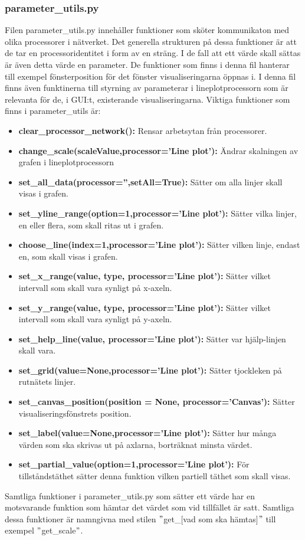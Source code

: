 \subsubsection{parameter\_utils.py}\label{sssec:paramUtils}
Filen parameter\_utils.py innehåller funktioner som sköter kommunikaton med olika processorer i nätverket. Det generella strukturen på dessa funktioner är att de tar en processoridentitet i form av en sträng. I de fall att ett värde skall sättas är även detta värde en parameter. De funktioner som finns i denna fil hanterar till exempel fönsterposition för det fönster visualiseringarna öppnas i. I denna fil finns även funktinerna till styrning av parameterar i lineplotprocessorn som är relevanta för de, i GUI:t, existerande visualiseringarna. 
Viktiga funktioner som finns i parameter\_utils är:
\begin{itemize}
    \setlength\itemsep{0em}
    \item \textbf{clear\_processor\_network(): }Rensar arbetsytan från processorer.
    \item \textbf{change\_scale(scaleValue,processor='Line plot'): }Ändrar skalningen av grafen i lineplotprocessorn
    \item \textbf{set\_all\_data(processor='',setAll=True): }Sätter om alla linjer skall visas i grafen.
    \item \textbf{set\_yline\_range(option=1,processor='Line plot'): }Sätter vilka linjer, en eller flera, som skall ritas ut i grafen.
    \item \textbf{choose\_line(index=1,processor='Line plot'): }Sätter vilken linje, endast en, som skall visas i grafen.
    \item \textbf{set\_x\_range(value, type, processor='Line plot'): }Sätter vilket intervall som skall vara synligt på x-axeln.
    \item \textbf{set\_y\_range(value, type, processor='Line plot'): }Sätter vilket intervall som skall vara synligt på y-axeln.
    \item \textbf{set\_help\_line(value, processor='Line plot'): }Sätter var hjälp-linjen skall vara.
    \item \textbf{set\_grid(value=None,processor='Line plot'): }Sätter tjockleken på rutnätets linjer.
    \item \textbf{set\_canvas\_position(position = None, processor='Canvas'): }Sätter visualiseringsfönstrets position.
    \item \textbf{set\_label(value=None,processor='Line plot'): }Sätter hur många värden som ska skrivas ut på axlarna, borträknat minsta värdet.
    \item \textbf{set\_partial\_value(option=1,processor='Line plot'): }För tillståndstäthet sätter denna funktion vilken partiell täthet som skall visas.
\end{itemize}

Samtliga funktioner i parameter\_utils.py som sätter ett värde har en motsvarande funktion som hämtar det värdet som vid tillfället är satt. Samtliga dessa funktioner är namngivna med stilen $"$get\_[vad som ska hämtas]$"$ till exempel $"$get\_scale$"$.

